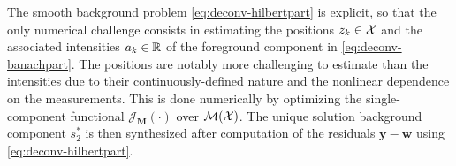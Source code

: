 \documentclass[12pt]{article}
\begin{document}
    
        
        The smooth background problem \eqref{eq:deconv-hilbertpart} is explicit, so that the only numerical challenge consists in estimating the positions $z_k \in \mathcal{X}$ and the associated intensities $a_k \in \mathbb{R}$ of the foreground component in \eqref{eq:deconv-banachpart}. The positions are notably more challenging to estimate than the intensities due to their continuously-defined nature and the nonlinear dependence on the measurements. This is done numerically by optimizing the single-component functional $\mathcal{J}_{\mathbf{M}}(\cdot)$ over ${\mathcal{M}}({\mathcal{X}})$.
        The unique solution background component $s_2^*$ is then synthesized after computation of the residuals $\bm{y}-\bm{w}$ using \eqref{eq:deconv-hilbertpart}.
\end{document}
